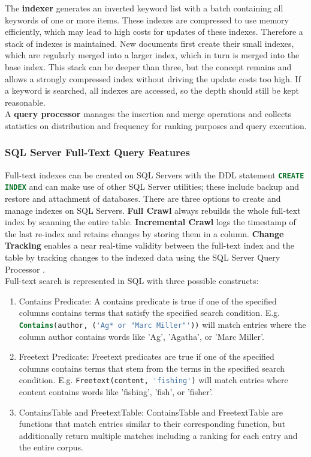 The \textbf{indexer} generates an inverted keyword list with a batch containing all keywords of one or more items. These indexes are compressed to use memory efficiently, which may lead to high costs for updates of these indexes. Therefore a stack of indexes is maintained. New documents first create their small indexes, which are regularly merged into a larger index, which in turn is merged into the base index. This stack can be deeper than three, but the concept remains and allows a strongly compressed index without driving the update costs too high. If a keyword is searched, all indexes are accessed, so the depth should still be kept reasonable.\\
A \textbf{query processor} manages the insertion and merge operations and collects statistics on distribution and frequency for ranking purposes and query execution.
\subsubsection{SQL Server Full-Text Query Features}
Full-text indexes can be created on \ac{SQL} Servers with the \ac{DDL} statement \lstinline[language=SQL]$CREATE INDEX$ and can make use of other \ac{SQL} Server utilities; these include backup and restore and attachment of databases. There are three options to create and manage indexes on \ac{SQL} Servers. \textbf{Full Crawl} always rebuilds the whole full-text index by scanning the entire table. \textbf{Incremental Crawl} logs the timestamp of the last re-index and retains changes by storing them in a column. \textbf{Change Tracking} enables a near real-time validity between the full-text index and the table by tracking changes to the indexed data using the \ac{SQL} Server Query Processor \parencite[cf.][p. 9]{hamilton_microsoft_2001}.\\
Full-text search is represented in \ac{SQL} with three possible constructs: \parencite[cf.][p. 9]{hamilton_microsoft_2001}
\begin{enumerate}
    \item Contains Predicate: A contains predicate is true if one of the specified columns contains terms that satisfy the specified search condition. E.g. \lstinline[language=SQL]$Contains(author, ('Ag* or "Marc Miller"'))$ will match entries where the column author contains words like 'Ag', 'Agatha', or 'Marc Miller'.
    \item Freetext Predicate: Freetext predicates are true if one of the specified columns contains terms that stem from the terms in the specified search condition. E.g. \lstinline[language=SQL]$Freetext(content, 'fishing')$ will match entries where content contains words like 'fishing', 'fish', or 'fisher'.
    \item ContainsTable and FreetextTable: ContainsTable and FreetextTable are functions that match entries similar to their corresponding function, but additionally return multiple matches including a ranking for each entry and the entire corpus.
\end{enumerate}

